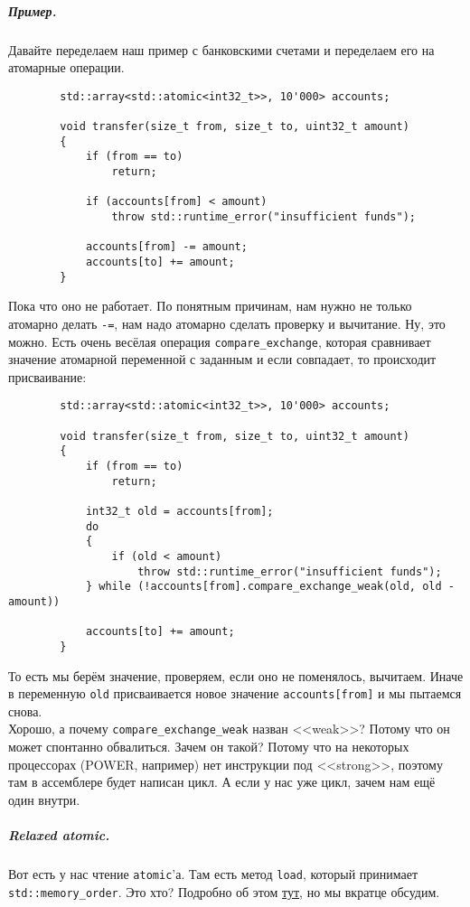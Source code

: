 \documentclass{article}
\begin{document}
    \subparagraph{Пример.}
    Давайте переделаем наш пример с банковскими счетами и переделаем его на атомарные операции.
    \begin{verbatim}
        std::array<std::atomic<int32_t>>, 10'000> accounts;

        void transfer(size_t from, size_t to, uint32_t amount)
        {
            if (from == to)
                return;
            
            if (accounts[from] < amount)
                throw std::runtime_error("insufficient funds");
            
            accounts[from] -= amount;
            accounts[to] += amount;
        }
    \end{verbatim}
    Пока что оно не работает. По понятным причинам, нам нужно не только атомарно делать \texttt{-=}, нам надо атомарно сделать проверку и вычитание. Ну, это можно. Есть очень весёлая операция \texttt{compare_exchange}, которая сравнивает значение атомарной переменной с заданным и если совпадает, то происходит присваивание:
    \begin{verbatim}
        std::array<std::atomic<int32_t>>, 10'000> accounts;
        
        void transfer(size_t from, size_t to, uint32_t amount)
        {
            if (from == to)
                return;
            
            int32_t old = accounts[from];
            do
            {
                if (old < amount)
                    throw std::runtime_error("insufficient funds");
            } while (!accounts[from].compare_exchange_weak(old, old - amount))

            accounts[to] += amount;
        }
    \end{verbatim}
    То есть мы берём значение, проверяем, если оно не поменялось, вычитаем. Иначе в переменную \texttt{old} присваивается новое значение \texttt{accounts[from]} и мы пытаемся снова.\\
    Хорошо, а почему \texttt{compare_exchange_weak} назван <<weak>>? Потому что он может спонтанно обвалиться. Зачем он такой? Потому что на некоторых процессорах (POWER, например) нет инструкции под <<strong>>, поэтому там в ассемблере будет написан цикл. А если у нас уже цикл, зачем нам ещё один внутри.
    \subparagraph{Relaxed atomic.}
    Вот есть у нас чтение \texttt{atomic}'а. Там есть метод \texttt{load}, который принимает \texttt{std::memory_order}. Это хто? Подробно об этом \href{https://www.youtube.com/watch?v=A8eCGOqgvH4}{тут}, но мы вкратце обсудим.\\
\end{document}
